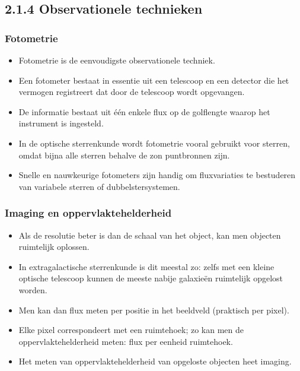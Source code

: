 \documentclass[10pt,a4paper]{article}
\begin{document}
\subsection*{2.1.4 Observationele technieken}
\subsubsection*{Fotometrie}

\begin{itemize}
  \item Fotometrie is de eenvoudigste observationele techniek.
  \item Een fotometer bestaat in essentie uit een telescoop en een detector die het vermogen registreert dat door de telescoop wordt opgevangen.
  \item De informatie bestaat uit \'e\'en enkele flux op de golflengte waarop het instrument is ingesteld.
  \item In de optische sterrenkunde wordt fotometrie vooral gebruikt voor sterren, omdat bijna alle sterren behalve de zon puntbronnen zijn.
  \item Snelle en nauwkeurige fotometers zijn handig om fluxvariaties te bestuderen van variabele sterren of dubbelstersystemen.
\end{itemize}

\subsubsection*{Imaging en oppervlaktehelderheid}
\begin{itemize}
  \item Als de resolutie beter is dan de schaal van het object, kan men objecten ruimtelijk oplossen.
  \item In extragalactische sterrenkunde is dit meestal zo: zelfs met een kleine optische telescoop kunnen de meeste nabije galaxie\"en ruimtelijk opgelost worden.
  \item Men kan dan flux meten per positie in het beeldveld (praktisch per pixel).
  \item Elke pixel correspondeert met een ruimtehoek; zo kan men de oppervlaktehelderheid meten: flux per eenheid ruimtehoek.
  \item Het meten van oppervlaktehelderheid van opgeloste objecten heet imaging.
\end{itemize}
\end{document}
